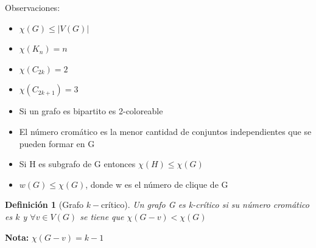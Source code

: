 \documentclass[a4paper,1pt]{report}
\newtheorem*{dfn}{Definición}
\begin{document}
Observaciones:
\begin{itemize}
 \item $\chi(G) \leq |V(G)|$
 \item $\chi (K_n)=n$
 \item $\chi (C_{2k})=2$
 \item $\chi (C_{2k+1})=3$
 \item Si un grafo es bipartito es 2-coloreable
 \item El número cromático es la menor cantidad de conjuntos independientes que se pueden formar en G
 \item Si H es subgrafo de G entonces $\chi (H)\leq \chi (G)$
 \item $w(G)\leq \chi (G)$, donde w es el número de clique de G
\end{itemize}

\begin{dfn}[Grafo $k-$cr\'itico]
 Un grafo G es k-crítico si su n\'umero crom\'atico es $k$ y $\forall v\in V(G)$ se tiene que $\chi (G-v)<\chi (G)$
\end{dfn}

\textbf{Nota:} $\chi (G-v)=k-1$
\end{document}

